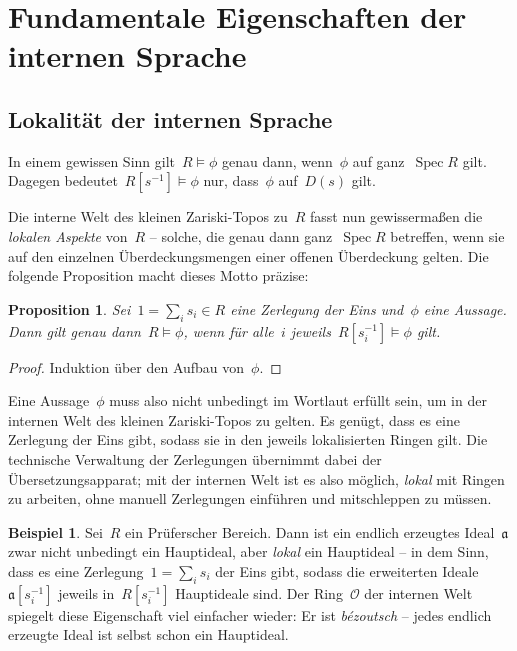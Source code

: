 \documentclass[a4paper,ngerman,12pt]{scrartcl}
\theoremstyle{definition}
\newtheorem{bsp}[defn]{Beispiel}
\theoremstyle{plain}
\newtheorem{prop}[defn]{Proposition}
\theoremstyle{remark}
\renewcommand{\aa}{\mathfrak{a}}
\renewcommand{\O}{\mathcal{O}}
\DeclareMathOperator{\Spec}{Spec}
\renewcommand{\_}{\mathpunct{.}\,}
\newcommand{\?}{\,{:}\,}
\begin{document}
\section{Fundamentale Eigenschaften der internen Sprache}

\subsection{Lokalität der internen Sprache}

In einem gewissen Sinn gilt~$R \models \phi$ genau dann, wenn~$\phi$ auf ganz~$\Spec R$
gilt. Dagegen bedeutet~$R[s^{-1}] \models \phi$ nur, dass~$\phi$ auf~$D(s)$
gilt.

Die interne Welt des kleinen Zariski-Topos zu~$R$ fasst nun gewissermaßen die
\emph{lokalen Aspekte} von~$R$ -- solche, die genau dann ganz~$\Spec R$
betreffen, wenn sie auf den einzelnen Überdeckungsmengen einer offenen
Überdeckung gelten. Die folgende Proposition macht dieses Motto präzise:
\begin{prop}Sei~$1 = \sum_i s_i \in R$ eine Zerlegung der Eins und~$\phi$ eine
Aussage. Dann gilt genau dann~$R \models \phi$, wenn für alle~$i$
jeweils~$R[s_i^{-1}] \models \phi$ gilt.\end{prop}
\begin{proof}Induktion über den Aufbau von~$\phi$.\end{proof}

Eine Aussage~$\phi$ muss also nicht unbedingt im Wortlaut erfüllt sein, um in
der internen Welt des kleinen Zariski-Topos zu gelten. Es genügt, dass es
eine Zerlegung der Eins gibt, sodass sie in den jeweils lokalisierten Ringen gilt.
Die technische Verwaltung der Zerlegungen übernimmt dabei der
Übersetzungsapparat; mit der internen Welt ist es also möglich, \emph{lokal}
mit Ringen zu arbeiten, ohne manuell Zerlegungen einführen und mitschleppen
zu müssen.

\begin{bsp}\label{lokal-hauptideale}%
Sei~$R$ ein Prüferscher Bereich. Dann ist ein endlich erzeugtes
Ideal~$\aa$ zwar nicht unbedingt ein Hauptideal, aber \emph{lokal} ein
Hauptideal -- in dem Sinn, dass es eine Zerlegung~$1 = \sum_i s_i$ der Eins
gibt, sodass die erweiterten Ideale~$\aa[s_i^{-1}]$ jeweils in~$R[s_i^{-1}]$
Hauptideale sind. Der Ring~$\O$ der internen Welt spiegelt diese Eigenschaft
viel einfacher wieder: Er ist \emph{bézoutsch} -- jedes endlich
erzeugte Ideal ist selbst schon ein Hauptideal.\end{bsp}
\end{document}

